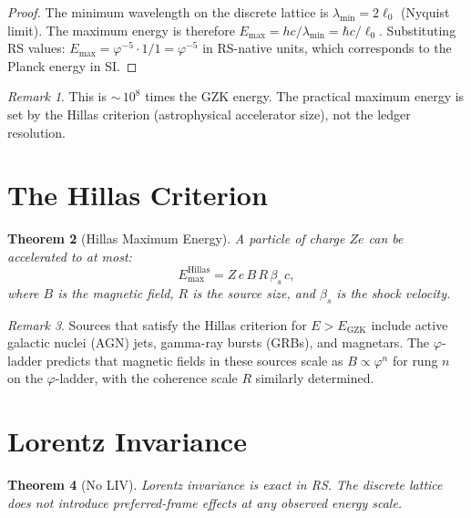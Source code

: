 \documentclass[12pt,a4paper]{article}
\newtheorem{theorem}{Theorem}[section]
\theoremstyle{definition}
\theoremstyle{remark}
\newtheorem{remark}[theorem]{Remark}
\begin{document}
\begin{proof}
The minimum wavelength on the discrete lattice is $\lambda_{\min}
= 2\ell_0$ (Nyquist limit).  The maximum energy is therefore
$E_{\max} = hc/\lambda_{\min} = \hbar c/\ell_0$.  Substituting RS
values: $E_{\max} = \varphi^{-5} \cdot 1/1 = \varphi^{-5}$ in
RS-native units, which corresponds to the Planck energy in SI.
\end{proof}

\begin{remark}
This is ${\sim}\,10^8$ times the GZK energy.  The practical maximum
energy is set by the Hillas criterion (astrophysical accelerator
size), not the ledger resolution.
\end{remark}

\section{The Hillas Criterion}
\label{sec:hillas}

\begin{theorem}[Hillas Maximum Energy]
\label{thm:hillas}
A particle of charge $Ze$ can be accelerated to at most:
\begin{equation}
  E_{\max}^{\mathrm{Hillas}} = Z\,e\,B\,R\,\beta_s\,c,
\end{equation}
where $B$ is the magnetic field, $R$ is the source size, and
$\beta_s$ is the shock velocity.
\end{theorem}

\begin{remark}
Sources that satisfy the Hillas criterion for $E > E_{\mathrm{GZK}}$
include active galactic nuclei (AGN) jets, gamma-ray bursts (GRBs),
and magnetars.  The $\varphi$-ladder predicts that magnetic fields in
these sources scale as $B \propto \varphi^n$ for rung $n$ on the
$\varphi$-ladder, with the coherence scale $R$ similarly determined.
\end{remark}

\section{Lorentz Invariance}
\label{sec:lorentz}

\begin{theorem}[No LIV]
Lorentz invariance is exact in RS.  The discrete lattice does not
introduce preferred-frame effects at any observed energy scale.
\end{theorem}
\end{document}
